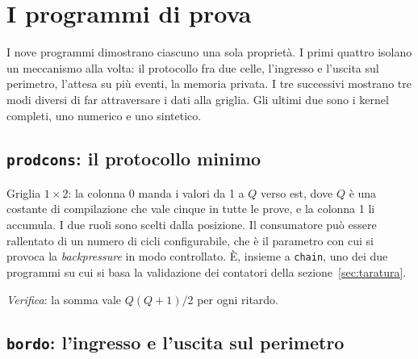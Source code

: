 \section{I programmi di prova}
\label{sec:kernel}

I nove programmi dimostrano ciascuno una sola proprietà. I primi quattro
isolano un meccanismo alla volta: il protocollo fra due celle, l'ingresso e
l'uscita sul perimetro, l'attesa su più eventi, la memoria privata. I tre
successivi mostrano tre modi diversi di far attraversare i dati alla griglia.
Gli ultimi due sono i kernel completi, uno numerico e uno sintetico.

\subsection{\texttt{prodcons}: il protocollo minimo}

Griglia $1\times2$: la colonna 0 manda i valori da 1 a $Q$ verso est, dove $Q$
è una costante di compilazione che vale cinque in tutte le prove, e la colonna
1 li accumula. I due ruoli sono scelti dalla posizione. Il consumatore può
essere rallentato di un numero di cicli configurabile, che è il parametro con
cui si provoca la \emph{backpressure} in modo controllato. È, insieme a
\texttt{chain}, uno dei due programmi su cui si basa la validazione dei
contatori della sezione~\ref{sec:taratura}.

\emph{Verifica}: la somma vale $Q(Q+1)/2$ per ogni ritardo.

\subsection{\texttt{bordo}: l'ingresso e l'uscita sul perimetro}

